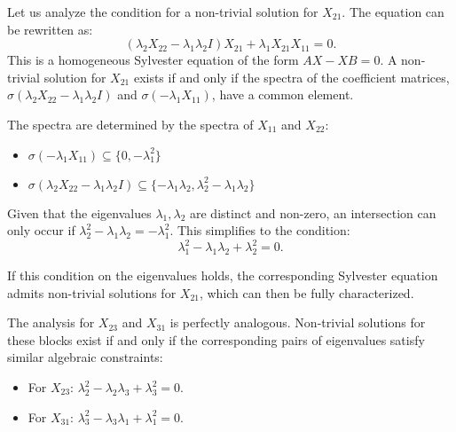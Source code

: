 \documentclass{article}
\begin{document}
Let us analyze the condition for a non-trivial solution for $X_{21}$. The equation can be rewritten as:
\[
(\lambda_2 X_{22} - \lambda_1 \lambda_2 I) X_{21} + \lambda_1 X_{21} X_{11} = 0.
\]
This is a homogeneous Sylvester equation of the form $AX - XB = 0$. A non-trivial solution for $X_{21}$ exists if and only if the spectra of the coefficient matrices, $\sigma(\lambda_2 X_{22} - \lambda_1 \lambda_2 I)$ and $\sigma(-\lambda_1 X_{11})$, have a common element.

The spectra are determined by the spectra of $X_{11}$ and $X_{22}$:
\begin{itemize}
    \item $\sigma(-\lambda_1 X_{11}) \subseteq \{0, -\lambda_1^2\}$
    \item $\sigma(\lambda_2 X_{22} - \lambda_1 \lambda_2 I) \subseteq \{-\lambda_1 \lambda_2, \lambda_2^2 - \lambda_1 \lambda_2\}$
\end{itemize}

Given that the eigenvalues $\lambda_1, \lambda_2$ are distinct and non-zero, an intersection can only occur if $\lambda_2^2 - \lambda_1 \lambda_2 = - \lambda_1^2$. This simplifies to the condition:
\[
\lambda_1^2 - \lambda_1 \lambda_2 + \lambda_2^2 = 0.
\]

If this condition on the eigenvalues holds, the corresponding Sylvester equation admits non-trivial solutions for $X_{21}$, which can then be fully characterized.

The analysis for $X_{23}$ and $X_{31}$ is perfectly analogous. Non-trivial solutions for these blocks exist if and only if the corresponding pairs of eigenvalues satisfy similar algebraic constraints:
\begin{itemize}
    \item For $X_{23}$: $\lambda_2^2 - \lambda_2 \lambda_3 + \lambda_3^2 = 0$.
    \item For $X_{31}$: $\lambda_3^2 - \lambda_3 \lambda_1 + \lambda_1^2 = 0$.
\end{itemize}
\end{document}
